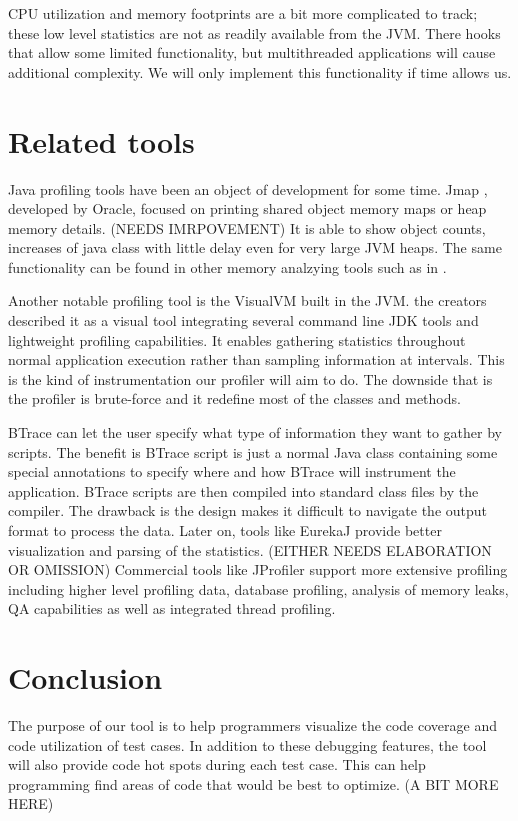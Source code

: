 \documentclass{article}
\begin{document}
CPU utilization and memory footprints are a bit more complicated to track; these low level statistics are not as readily available from the JVM.
There hooks that allow some limited functionality, but multithreaded applications will cause additional complexity.
We will only implement this functionality if time allows us.

\section{Related tools}

Java profiling tools have been an object of development for some time.
Jmap \cite{Oraclejmap}, developed by Oracle, focused on printing shared object memory maps or heap memory details.
(NEEDS IMRPOVEMENT) It is able to show object counts, increases of java class with little delay even for very large JVM heaps.
The same functionality can be found in other memory analzying tools such as in \cite{MAT}.

Another notable profiling tool is the VisualVM \cite{VisualVM} built in the JVM.
the creators described it as a visual tool integrating several command line JDK tools and lightweight profiling capabilities.
It enables gathering statistics throughout normal application execution rather than sampling information at intervals.
This is the kind of instrumentation our profiler will aim to do.
The downside that is the profiler is brute-force and it redefine most of the classes and methods.

BTrace \cite{BTrace} can let the user specify what type of information they want to gather by scripts.
The benefit is BTrace script is just a normal Java class containing some special annotations to specify where and how BTrace will instrument the application.
BTrace scripts are then compiled into standard class files by the compiler.
The drawback is the design makes it difficult to navigate the output format to process the data.
Later on, tools like EurekaJ \cite{EurekaJ} provide better visualization and parsing of the statistics.
(EITHER NEEDS ELABORATION OR OMISSION) Commercial tools like JProfiler \cite{JProfiler} support more extensive profiling including higher level profiling data, database profiling, analysis of memory leaks, QA capabilities as well as integrated thread profiling.

\section{Conclusion}
The purpose of our tool is to help programmers visualize the code coverage and code utilization of test cases.
In addition to these debugging features, the tool will also provide code hot spots during each test case.
This can help programming find areas of code that would be best to optimize.
(A BIT MORE HERE)



\end{document}
